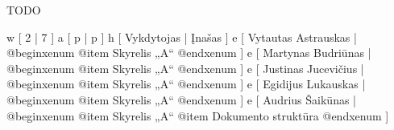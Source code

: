 
TODO

\xtable
{
  w [ 2  | 7 ]
  a [ p  | p ]
  h [ Vykdytojas | Įnašas ]
  e [ Vytautas Astrauskas 
  | @begin{xenum} 
      @item Skyrelis „A“
    @end{xenum}
  ]
  e [ Martynas Budriūnas
  | @begin{xenum} 
      @item Skyrelis „A“
    @end{xenum}
  ]
  e [ Justinas Jucevičius 
  | @begin{xenum} 
      @item Skyrelis „A“
    @end{xenum}
  ]
  e [ Egidijus Lukauskas 
  | @begin{xenum} 
      @item Skyrelis „A“
    @end{xenum}
  ]
  e [ Audrius Šaikūnas 
  | @begin{xenum} 
      @item Skyrelis „A“
      @item Dokumento struktūra
    @end{xenum}
  ]
}
